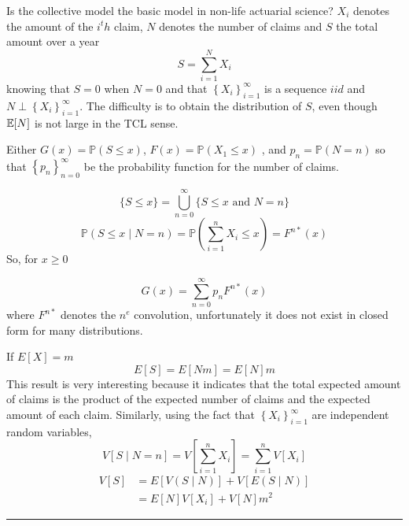 \begin{f}
Is the collective model the basic model in non-life actuarial science?
	 $X_{i}$ denotes the amount of the $i^th$ claim, $N$ denotes the number of claims and $S$ the total amount over a year
	$$
	S=\sum_{i=1}^{N} X_{i}
	$$
	knowing that $S=0$ when $N=0$ and that $\left\{X_{i}\right\}_{i=1}^{\infty}$ is a sequence $iid$ and  $N \perp \left\{X_{i}\right\}_{i=1}^{\infty}$. 
The difficulty is to obtain the distribution of $S$, even though $\mathbb{E} [N]$ is not large in the TCL sense.
\end{f}


\begin{f}
	
Either $G(x)=\mathbb{P}(S \leq x)$, $F(x)=\mathbb{P}\left(X_{1} \leq x\right)$ , and $p_{n}=\mathbb{P}(N=n)$ so that $\left\{p_{n}\right\}_{n=0}^{\infty}$ be the probability function for the number of claims.
	
	$$
	\{S \leq x\}=\bigcup_{n=0}^{\infty}\{S \leq x \text { and } N=n\}
	$$
	$$
	\mathbb{P}(S \leq x \mid N=n)=\mathbb{P}\left(\sum_{i=1}^{n} X_{i} \leq x\right)=F^{n *}(x)
	$$
	So, for $x \geq 0$
	
	\begin{equation*}\label{GxCollectif}
		G(x)=\sum_{n=0}^{\infty} p_{n} F^{n *}(x)
	\end{equation*}
	where $F^{n *}$ denotes the $n^e$ convolution, unfortunately it does not exist in closed form for many distributions.
	
If $E[X]=m$
	$$
	E[S]=E\left[N m\right]=E[N] m
	$$
	This result is very interesting because it indicates that the total expected amount of claims is the product of the expected number of claims and the expected amount of each claim. Similarly, using the fact that $\left\{X_{i}\right\}_{i=1}^{\infty}$ are independent random variables,
	$$
	V[S \mid N=n]=V\left[\sum_{i=1}^{n} X_{i}\right]=\sum_{i=1}^{n} V\left[X_{i}\right]
	$$
	$$
	\begin{aligned}
		V[S] &=E[V(S \mid N)]+V[E(S \mid N)] \\
		&=E[N] V\left[X_{i}\right]+V[N] m^{2}
	\end{aligned}
	$$    
\end{f}

\hrule


